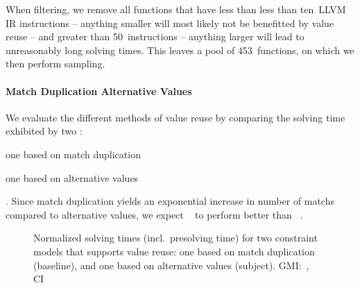When filtering, we remove all \glspl{function} that have less than less
than ten~\gls{LLVM} \gls{IR} \glspl{instruction} -- anything smaller will most
likely not be benefitted by \gls{value reuse} -- and greater than
\num{50}~\glspl{instruction} -- anything larger will lead to unreasonably long
solving times.
%
This leaves a pool of \num{453}~\glspl{function}, on which we then perform
sampling.


\paragraph{Match Duplication \versus Alternative Values}

We evaluate the different methods of \gls{value reuse} by comparing the solving
time exhibited by two :
%
\begin{modelList}
  \item {}
    one based on \gls{match duplication}
  \item {}
    one based on \glspl{alternative value}
\end{modelList}.
%
Since \gls{match duplication} yields an exponential increase in number of
\glspl{match} compared to \glspl{alternative value}, we expect
~ to perform better than
~.



\begin{figure}
  \centering%
  \maxsizebox{\textwidth}{!}{%
    \trimBarchartPlot{%
    }%
  }

  \caption[%
            Plot for evaluating match duplication's and alternative values'
            impact on solving time%
          ]%
          {%
            Normalized solving times (incl.\ presolving time) for two
            constraint models that supports value reuse: one based on match
            duplication (baseline), and one based on alternative values
            (subject).
            GMI:~\printGMI{%
              \AltValuesVsMatchDupPrePlusSolvingTimeSpeedupPrePlusSolvingTimeRegularSpeedupGmean%
            },
            CI~\printGMICI{%
              \AltValuesVsMatchDupPrePlusSolvingTimeSpeedupPrePlusSolvingTimeRegularSpeedupCiMin%
            }{%
              \AltValuesVsMatchDupPrePlusSolvingTimeSpeedupPrePlusSolvingTimeRegularSpeedupCiMax%
            }%
          }
\end{figure}

